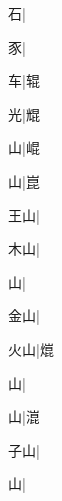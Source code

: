 \begin{multicols}{2}
{{\cjk{}{\cnsym{}　}{\cnsym{}　}石}|{}\par
{\cjk{}{\cnsym{}　}{\cnsym{}　}豕}|{}\par
{\cjk{}{\cnsym{}　}{\cnsym{}　}车}|{\cjk{}辊}\par
{\cjk{}{\cnsym{}　}{\cnsym{}　}光}|{\cjk{}尡}\par
{\cjk{}{\cnsym{}　}{\cnsym{}　}山}|{\cjk{}崐}\par
{\cjk{}{\cnsym{}　}{\cnsym{}　}山}|{\cjk{}崑}\par
{\cjk{}{\cnsym{}　}王山}|{}\par
{\cjk{}{\cnsym{}　}木山}|{}\par
{山}|{}\par
{\cjk{}{\cnsym{}　}金山}|{}\par
{\cjk{}{\cnsym{}　}火山}|{\cjk{}熴}\par
{山}|{}\par
{山}|{\cjk{}潉}\par
{\cjk{}{\cnsym{}　}子山}|{}\par
{山}|{}\par
}
\end{multicols}
